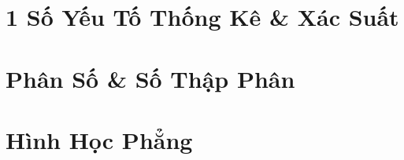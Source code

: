 \documentclass{article}
\numberwithin{equation}{section}
\begin{document}

\section{1 Số Yếu Tố Thống Kê \& Xác Suất}


\section{Phân Số \& Số Thập Phân}


\section{Hình Học Phẳng}


\printbibliography[heading=bibintoc]
	
\end{document}
